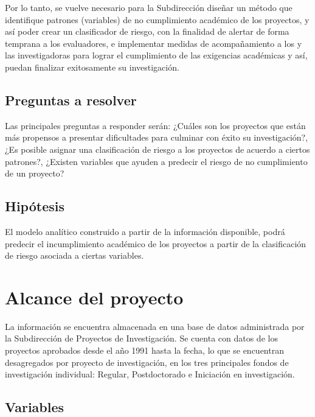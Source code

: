 \documentclass[
]{article}
\begin{document}
\noindent Por lo tanto, se vuelve necesario para la Subdirección diseñar
un método que identifique patrones (variables) de no cumplimiento
académico de los proyectos, y así poder crear un clasificador de riesgo,
con la finalidad de alertar de forma temprana a los evaluadores, e
implementar medidas de acompañamiento a los y las investigadoras para
lograr el cumplimiento de las exigencias académicas y así, puedan
finalizar exitosamente su investigación.

\subsection{Preguntas a resolver}

Las principales preguntas a responder serán: ¿Cuáles son los proyectos
que están más propensos a presentar dificultades para culminar con éxito
su investigación?, ¿Es posible asignar una clasificación de riesgo a los
proyectos de acuerdo a ciertos patrones?, ¿Existen variables que ayuden
a predecir el riesgo de no cumplimiento de un proyecto?

\subsection{Hipótesis}

El modelo analítico construido a partir de la información disponible,
podrá predecir el incumplimiento académico de los proyectos a partir de
la clasificación de riesgo asociada a ciertas variables.

\section{Alcance del proyecto}

La información se encuentra almacenada en una base de datos administrada
por la Subdirección de Proyectos de Investigación. Se cuenta con datos
de los proyectos aprobados desde el año 1991 hasta la fecha, lo que se
encuentran desagregados por proyecto de investigación, en los tres
principales fondos de investigación individual: Regular, Postdoctorado e
Iniciación en investigación.

\subsection{Variables}
\end{document}
